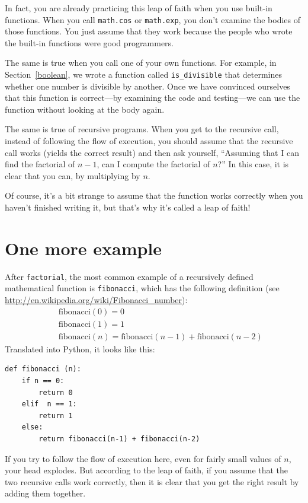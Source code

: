 \documentclass[10pt]{book}
\begin{document}
In fact, you are already practicing this leap of faith when you use
built-in functions.  When you call {\tt math.cos} or {\tt math.exp},
you don't examine the bodies of those functions.  You just
assume that they work because the people who wrote the built-in
functions were good programmers.

The same is true when you call one of your own functions.  For
example, in Section~\ref{boolean}, we wrote a function called 
\verb"is_divisible" that determines whether one number is divisible by
another.  Once we have convinced ourselves that this function is
correct---by examining the code and testing---we can use the function
without looking at the body again.

The same is true of recursive programs.  When you get to the recursive
call, instead of following the flow of execution, you should assume
that the recursive call works (yields the correct result) and then ask
yourself, ``Assuming that I can find the factorial of $n-1$, can I
compute the factorial of $n$?''  In this case, it is clear that you
can, by multiplying by $n$.

Of course, it's a bit strange to assume that the function works
correctly when you haven't finished writing it, but that's why
it's called a leap of faith!


\section{One more example}
\label{one.more.example}

After {\tt factorial}, the most common example of a recursively
defined mathematical function is {\tt fibonacci}, which has the
following definition (see
  \url{http://en.wikipedia.org/wiki/Fibonacci_number}):
%
\begin{eqnarray*}
&& \mathrm{fibonacci}(0) = 0 \\
&& \mathrm{fibonacci}(1) = 1 \\
&& \mathrm{fibonacci}(n) = \mathrm{fibonacci}(n-1) + \mathrm{fibonacci}(n-2)
\end{eqnarray*}
%
Translated into Python, it looks like this:

\begin{verbatim}
def fibonacci (n):
    if n == 0:
        return 0
    elif  n == 1:
        return 1
    else:
        return fibonacci(n-1) + fibonacci(n-2)
\end{verbatim}
%
If you try to follow the flow of execution here, even for fairly
small values of $n$, your head explodes.  But according to the
leap of faith, if you assume that the two recursive calls
work correctly, then it is clear that you get
the right result by adding them together.
\end{document}
